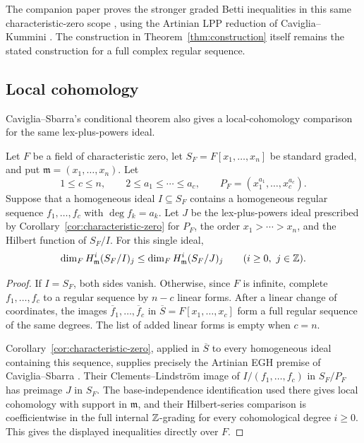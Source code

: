 The companion paper proves the stronger graded Betti inequalities in
this same characteristic-zero scope
\cite[Corollary~1.2]{BettiCompanion}, using the Artinian LPP reduction
of Caviglia--Kummini \cite[Theorem~4.1]{CK14}. The construction in
Theorem~\ref{thm:construction} itself remains the stated construction
for a full complex regular sequence.

\subsection{Local cohomology}

Caviglia--Sbarra's conditional theorem
\cite[Theorem~4.4]{CavigliaSbarra13} also gives a local-cohomology
comparison for the same lex-plus-powers ideal.

\begin{corollary}
\label{cor:local-cohomology}
Let \(F\) be a field of characteristic zero, let
\(S_F=F[x_1,\ldots,x_n]\) be standard graded, and put
\(\mathfrak m=(x_1,\ldots,x_n)\). Let
\[
 1\le c\le n,\qquad 2\le a_1\le\cdots\le a_c,
 \qquad P_F=(x_1^{a_1},\ldots,x_c^{a_c}).
\]
Suppose that a homogeneous ideal \(I\subseteq S_F\) contains a homogeneous
regular sequence \(f_1,\ldots,f_c\) with \(\deg f_k=a_k\). Let \(J\) be the
lex-plus-powers ideal prescribed by Corollary~\ref{cor:characteristic-zero}
for \(P_F\), the order \(x_1>\cdots>x_n\), and the Hilbert function of
\(S_F/I\). For this single ideal,
\[
 \dim_F H^i_{\mathfrak m}(S_F/I)_j
 \le
 \dim_F H^i_{\mathfrak m}(S_F/J)_j
 \qquad(i\ge0,\ j\in\mathbb Z).
\]
\end{corollary}

\begin{proof}
If \(I=S_F\), both sides vanish. Otherwise, since \(F\) is infinite,
complete \(f_1,\ldots,f_c\) to a regular sequence by \(n-c\) linear forms.
After a linear change of coordinates, the images
\(\overline f_1,\ldots,\overline f_c\) in
\(\overline S=F[x_1,\ldots,x_c]\) form a full regular sequence of the same
degrees. The list of added linear forms is empty when \(c=n\).

Corollary~\ref{cor:characteristic-zero}, applied in \(\overline S\) to every
homogeneous ideal containing this sequence, supplies precisely the Artinian
EGH premise of Caviglia--Sbarra \cite[Theorem~4.4]{CavigliaSbarra13}.
Their Clements--Lindstr\"om image of \(I/(f_1,\ldots,f_c)\) in \(S_F/P_F\)
has preimage \(J\) in \(S_F\). The base-independence identification used
there gives local cohomology with support in \(\mathfrak m\), and their
Hilbert-series comparison is coefficientwise in the full internal
\(\mathbb Z\)-grading for every cohomological degree \(i\ge0\). This gives the
displayed inequalities directly over \(F\).
\end{proof}

